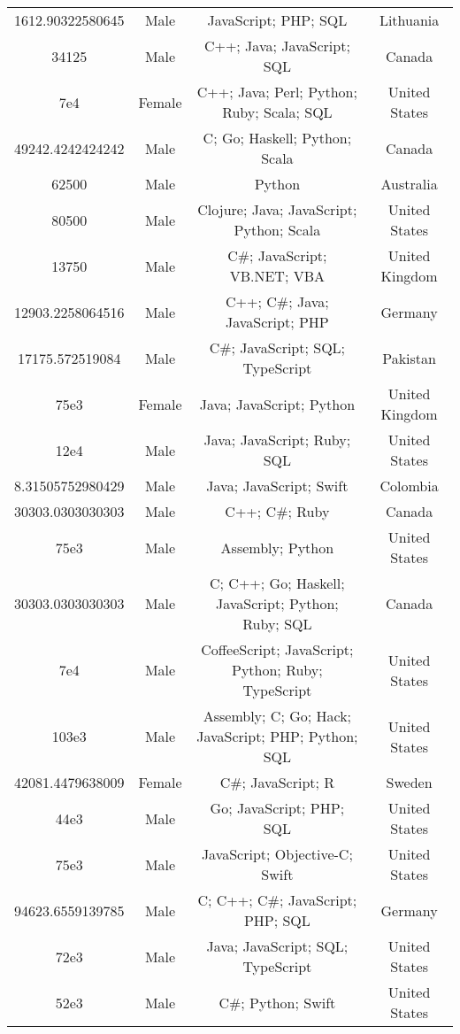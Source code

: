 \begin{center}
\begin{tabular}{ |c|c|c|c| }
1612.90322580645  &  Male  &  JavaScript; PHP; SQL  &  Lithuania  \\ 
34125  &  Male  &  C++; Java; JavaScript; SQL  &  Canada  \\ 
7e4  &  Female  &  C++; Java; Perl; Python; Ruby; Scala; SQL  &  United States  \\ 
49242.4242424242  &  Male  &  C; Go; Haskell; Python; Scala  &  Canada  \\ 
62500  &  Male  &  Python  &  Australia  \\ 
80500  &  Male  &  Clojure; Java; JavaScript; Python; Scala  &  United States  \\ 
13750  &  Male  &  C\#; JavaScript; VB.NET; VBA  &  United Kingdom  \\ 
12903.2258064516  &  Male  &  C++; C\#; Java; JavaScript; PHP  &  Germany  \\ 
17175.572519084  &  Male  &  C\#; JavaScript; SQL; TypeScript  &  Pakistan  \\ 
75e3  &  Female  &  Java; JavaScript; Python  &  United Kingdom  \\ 
12e4  &  Male  &  Java; JavaScript; Ruby; SQL  &  United States  \\ 
8.31505752980429  &  Male  &  Java; JavaScript; Swift  &  Colombia  \\ 
30303.0303030303  &  Male  &  C++; C\#; Ruby  &  Canada  \\ 
75e3  &  Male  &  Assembly; Python  &  United States  \\ 
30303.0303030303  &  Male  &  C; C++; Go; Haskell; JavaScript; Python; Ruby; SQL  &  Canada  \\ 
7e4  &  Male  &  CoffeeScript; JavaScript; Python; Ruby; TypeScript  &  United States  \\ 
103e3  &  Male  &  Assembly; C; Go; Hack; JavaScript; PHP; Python; SQL  &  United States  \\ 
42081.4479638009  &  Female  &  C\#; JavaScript; R  &  Sweden  \\ 
44e3  &  Male  &  Go; JavaScript; PHP; SQL  &  United States  \\ 
75e3  &  Male  &  JavaScript; Objective-C; Swift  &  United States  \\ 
94623.6559139785  &  Male  &  C; C++; C\#; JavaScript; PHP; SQL  &  Germany  \\ 
72e3  &  Male  &  Java; JavaScript; SQL; TypeScript  &  United States  \\ 
52e3  &  Male  &  C\#; Python; Swift  &  United States  \\ 

\end{tabular}
\end{center}
